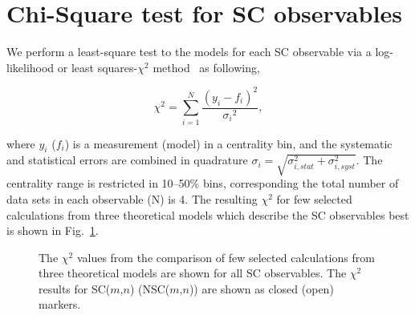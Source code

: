 \newpage
\section{Chi-Square test for SC observables}
\label{sec:chisq}
We perform a least-square test to the models for each SC observable via a log-likelihood or least squares-${\chi}^2$ method~\cite{PDBook} as following,

\begin{equation}
\chi^{2} = \sum_{i=1}^{N} \frac{{(y_i-f_i)}^{2}}{{\sigma_i}^{2}},
\label{Eq:chisq}
\end{equation}

where $y_i$ ($f_i$) is a measurement (model) in a centrality bin, and the systematic and statistical errors  are combined in quadrature $\sigma_i = \sqrt{\sigma_{i, stat}^2 + \sigma_{i, syst}^2}$.
The centrality range is restricted in 10--50\% bins, corresponding the total number of data sets in each observable (N) is 4.
The resulting ${\chi}^2$ for few selected calculations from three theoretical models which describe the SC observables best is shown in Fig.~\ref{fig:Figure_A5}.
\begin{figure}[h]
            \begin{center}
        \caption{The ${\chi}^2$ values from the comparison of few selected calculations from three theoretical models are shown for all SC observables. The ${\chi}^2$ results for SC($m$,$n$) (NSC($m$,$n$)) are shown as closed (open) markers.}
        \label{fig:Figure_A5}
              \end{center}
\end{figure}

